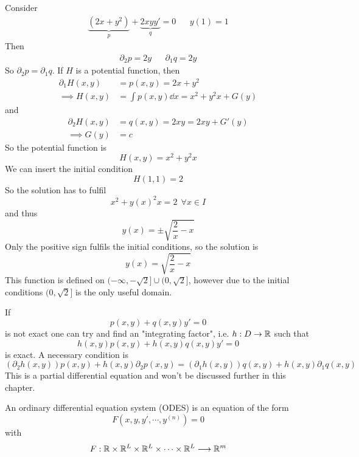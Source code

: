 \documentclass[../../script.tex]{subfiles}
\begin{document}
\begin{eg}
    Consider 
    \begin{align*}
        \underbrace{(2x + y^2)}_p + \underbrace{2xyy'}_q = 0 && y(1) = 1
    \end{align*}
    Then 
    \begin{align*}
        \partial_2 p = 2y && \partial_1 q = 2y
    \end{align*}
    So $\partial_2 p = \partial_1 q$. If $H$ is a potential function, then 
    \begin{align*}
        \partial_1 H(x, y) &= p(x, y) = 2x + y^2 \\
        \implies H(x, y) &= \int p(x, y) \dd{x} = x^2 + y^2x + G(y)
    \end{align*}
    and 
    \begin{align*}
        \partial_2 H(x, y) &= q(x, y) = 2xy = 2xy + G'(y) \\
        \implies G(y) &= c
    \end{align*}
    So the potential function is 
    \[
        H(x, y) = x^2 + y^2 x
    \]
    We can insert the initial condition 
    \[
        H(1, 1) = 2
    \]
    So the solution has to fulfil 
    \[
        x^2 + y(x)^2 x = 2 ~~\forall x \in I
    \]
    and thus 
    \[
        y(x) = \pm \sqrt{\frac{2}{x} - x}
    \]
    Only the positive sign fulfils the initial conditions, so the solution is 
    \[
        y(x) = \sqrt{\frac{2}{x} - x}
    \]
    This function is defined on $(-\infty, -\sqrt{2}] \cup (0, \sqrt{2}]$, however due to the initial conditions $(0, \sqrt{2}]$ is the only useful domain.
\end{eg}

\begin{rem}
    If 
    \[ 
        p(x, y) + q(x, y)y' = 0
    \]
    is not exact one can try and find an "integrating factor", i.e. $h: D \rightarrow \mathbb{R}$ such that 
    \[
        h(x, y)p(x, y) + h(x, y)q(x, y)y' = 0
    \]
    is exact. A necessary condition is 
    \[
        \left(\partial_2 h(x, y)\right)p(x, y) + h(x, y) \partial_2 p(x, y) = \left(\partial_1 h(x, y)\right) q(x, y) + h(x, y) \partial_1 q(x, y)
    \]
    This is a partial differential equation and won't be discussed further in this chapter.
\end{rem}

\begin{defi}
    An ordinary differential equation system (ODES) is an equation of the form 
    \[
        F(x, y, y', \cdots, y^{(n)}) = 0
    \]
    with 
    \[
        F: \mathbb{R} \times \mathbb{R}^L \times \mathbb{R}^L \times \cdots \times \mathbb{R}^L \longrightarrow \mathbb{R}^m
    \]
\end{defi}
\end{document}
